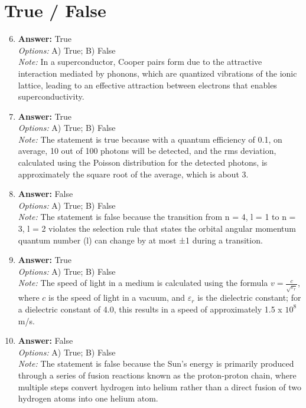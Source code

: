 \documentclass[12pt]{article}
\begin{document}
\section*{True / False}
\begin{enumerate}[label=\arabic*.]
\setcounter{enumi}{5}
\item \textbf{Answer:} True
\\ \textit{Options:} A) True; B) False
\\ \textit{Note:} In a superconductor, Cooper pairs form due to the attractive interaction mediated by phonons, which are quantized vibrations of the ionic lattice, leading to an effective attraction between electrons that enables superconductivity.
\item \textbf{Answer:} True
\\ \textit{Options:} A) True; B) False
\\ \textit{Note:} The statement is true because with a quantum efficiency of 0.1, on average, 10 out of 100 photons will be detected, and the rms deviation, calculated using the Poisson distribution for the detected photons, is approximately the square root of the average, which is about 3.
\item \textbf{Answer:} False
\\ \textit{Options:} A) True; B) False
\\ \textit{Note:} The statement is false because the transition from n = 4, l = 1 to n = 3, l = 2 violates the selection rule that states the orbital angular momentum quantum number (l) can change by at most ±1 during a transition.
\item \textbf{Answer:} True
\\ \textit{Options:} A) True; B) False
\\ \textit{Note:} The speed of light in a medium is calculated using the formula \( v = \frac{c}{\sqrt{\varepsilon_r}} \), where \( c \) is the speed of light in a vacuum, and \( \varepsilon_r \) is the dielectric constant; for a dielectric constant of 4.0, this results in a speed of approximately 1.5 x $10^8$ m/s.
\item \textbf{Answer:} False
\\ \textit{Options:} A) True; B) False
\\ \textit{Note:} The statement is false because the Sun's energy is primarily produced through a series of fusion reactions known as the proton-proton chain, where multiple steps convert hydrogen into helium rather than a direct fusion of two hydrogen atoms into one helium atom.
\end{enumerate}
\end{document}
